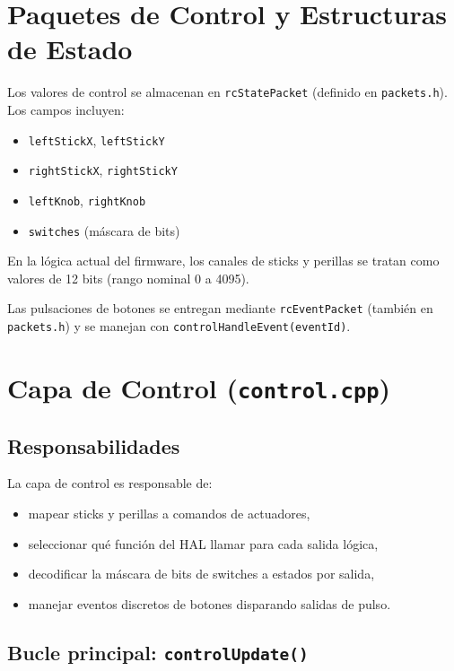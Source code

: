 \section{Paquetes de Control y Estructuras de Estado}
\label{sec:control-hal-packets}

Los valores de control se almacenan en \texttt{rcStatePacket} (definido en \texttt{packets.h}).
Los campos incluyen:

\begin{itemize}
    \item \texttt{leftStickX}, \texttt{leftStickY}
    \item \texttt{rightStickX}, \texttt{rightStickY}
    \item \texttt{leftKnob}, \texttt{rightKnob}
    \item \texttt{switches} (máscara de bits)
\end{itemize}

En la lógica actual del firmware, los canales de sticks y perillas se tratan como valores de 12 bits (rango nominal 0 a 4095).

Las pulsaciones de botones se entregan mediante \texttt{rcEventPacket} (también en \texttt{packets.h}) y se manejan con
\texttt{controlHandleEvent(eventId)}.

\section{Capa de Control (\texttt{control.cpp})}
\label{sec:control-hal-control-layer}

\subsection{Responsabilidades}
\label{subsec:control-hal-control-resp}

La capa de control es responsable de:

\begin{itemize}
    \item mapear sticks y perillas a comandos de actuadores,
    \item seleccionar qué función del HAL llamar para cada salida lógica,
    \item decodificar la máscara de bits de switches a estados por salida,
    \item manejar eventos discretos de botones disparando salidas de pulso.
\end{itemize}

\subsection{Bucle principal: \texttt{controlUpdate()}}
\label{subsec:control-hal-controlUpdate}

